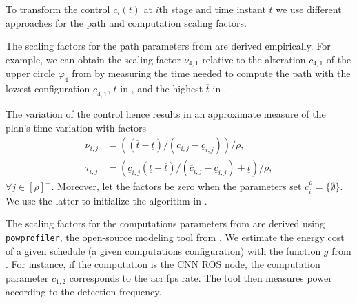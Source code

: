 To transform the control $c_i(t)$ at $i$th stage and time instant $t$ we use different approaches for the path and computation scaling factors.

The scaling factors for the path parameters from  are derived empirically. For example, we can obtain the scaling factor $\nu_{4,1}$ relative to the alteration $c_{4,1}$ of the upper circle $\varphi_4$ from  by measuring the time needed to compute the path with the lowest configuration $\underline{c}_{4,1}$, $\underline{t}$ in , and the highest $\overline{t}$ in . 

The variation of the control hence results in an approximate measure of the plan's time variation with factors
\begin{subequations}\label{eq:scale-traj}\begin{align}
  \nu_{i,j}&=\left((\overline{t}-\underline{t})/(\overline{c}_{i,j}-\underline{c}_{i,j})\right)/\rho,\\
  \tau_{i,j}&=\left(\underline{c}_{i,j}(\underline{t}-\overline{t})/(\overline{c}_{i,j}-\underline{c}_{i,j})+\underline{t}\right)/\rho,
\end{align}\end{subequations} 
$\forall j\in[\rho]^+$. Moreover, let the factors be zero when the parameters set $c_i^\rho=\{\emptyset\}$. We use the latter to initialize the algorithm in .


The scaling factors for the computations parameters from  are derived using {\small\tt{powprofiler}}, the open-source modeling tool from . We estimate the energy cost of a given schedule (a given computations configuration) with the function $g$ from . 
For instance, if the computation is the CNN ROS node, the computation parameter $c_{1,2}$ corresponds to the \Gls{acr:fps} rate. The tool then measures power according to the detection frequency.

